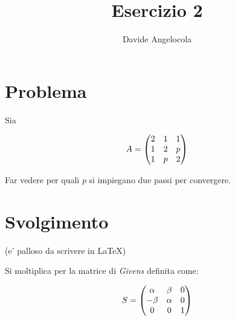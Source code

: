 \documentclass{article}
\title{Esercizio 2}
\author{Davide Angelocola}
\begin{document}
\maketitle

\section{Problema}

Sia 

$$ A = \begin{pmatrix} 
  2 & 1 & 1 \cr
  1 & 2 & p \cr
  1 & p & 2 \cr
\end{pmatrix}$$

Far vedere per quali $p$ si impiegano due passi per convergere.

\section{Svolgimento}

(e' palloso da scrivere in \LaTeX)

Si moltiplica per la matrice di \textit{Givens} definita come:

$$S = \begin{pmatrix}\alpha & \beta & 0 \cr -\beta & \alpha & 0 \cr 0 & 0 & 1\end{pmatrix}$$
\end{document}
